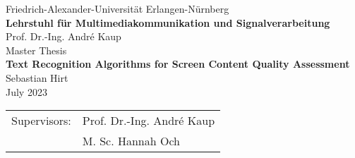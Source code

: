 \begin{titlepage}
    \vspace*{6ex}
    \begin{center}
        \LARGE
        Friedrich-Alexander-Universität Erlangen-Nürnberg\\[1.5ex]
        \Large
        \textbf{Lehrstuhl für Multimediakommunikation und Signalverarbeitung}\\[1.5ex]
        Prof. Dr.-Ing. André Kaup\\
        \vfill
        \LARGE
        Master Thesis\\[3ex]
        \textbf{Text Recognition Algorithms for Screen Content Quality Assessment}\\[3ex]
        Sebastian Hirt\\
        \vfill
        \Large
        July 2023\\[1.5ex]
        \begin{tabular}{ll}
            Supervisors: & Prof. Dr.-Ing. André Kaup \\
            & M. Sc. Hannah Och
        \end{tabular}
    \end{center}
\end{titlepage}
